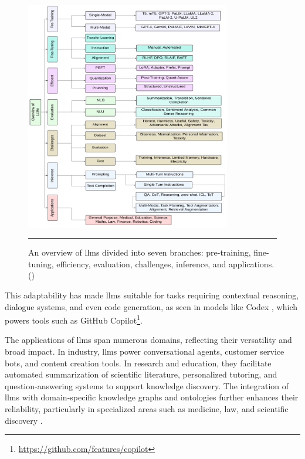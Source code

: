 \begin{figure}[htbp]
    \centering
 \includegraphics[width=0.8\textwidth]{03_Figures/literature-review/llms-overview.png}
     \rule{35em}{0.5pt}
    \caption{An overview of \glspl{llm} divided into seven branches: pre-training, fine-tuning, efficiency, evaluation, challenges, inference, and applications. (\textcite{Naveed2023})}
 \label{fig:llms-overview}
\end{figure}

This adaptability has made \glspl{llm} suitable for tasks requiring contextual reasoning, dialogue systems, and even code generation, as seen in models like Codex \cite{Chen2021EvaluatingLL}, which powers tools such as GitHub Copilot\footnote{\url{https://github.com/features/copilot}}.

The applications of \glspl{llm} span numerous domains, reflecting their versatility and broad impact.
In industry, \glspl{llm} power conversational agents, customer service bots, and content creation tools.
In research and education, they facilitate automated summarization of scientific literature, personalized tutoring, and question-answering systems to support knowledge discovery.
The integration of \glspl{llm} with domain-specific knowledge graphs and ontologies further enhances their reliability, particularly in specialized areas such as medicine, law, and scientific discovery \cite{Yang2024}.

